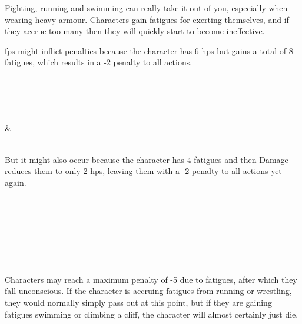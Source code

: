 \begin{multicols}{2}

\label{fatigue}

\noindent
Fighting, running and swimming can really take it out of you, especially when wearing heavy armour.
Characters gain \glspl{fatigue} for exerting themselves, and if they accrue too many then they will quickly start to become ineffective.



\Glspl{fp} might inflict penalties because the character has 6 \glspl{hp} but gains a total of 8 \glspl{fatigue}, which results in a -2 penalty to all actions.

\begin{boxtable}[lllllllllX]

   \\
    \statCircle
  \\
   \Square
  \\
   \\
   \Square & \Square \\
   \\

\end{boxtable}

But it might also occur because the character has 4 \glspl{fatigue} and then Damage reduces them to only 2 \glspl{hp}, leaving them with a -2 penalty to all actions yet again.

\begin{boxtable}[lllllllllX]

   \\
    \statCircle
  \\
     \Square
  \\
   \\
    \Square \\
   \\

\end{boxtable}

Characters may reach a maximum penalty of -5 due to \glspl{fatigue}, after which they fall unconscious.
If the character is accruing \glspl{fatigue} from running or wrestling, they would normally simply pass out at this point, but if they are gaining \glspl{fatigue} swimming or climbing a cliff, the character will almost certainly just die.


\end{multicols}
